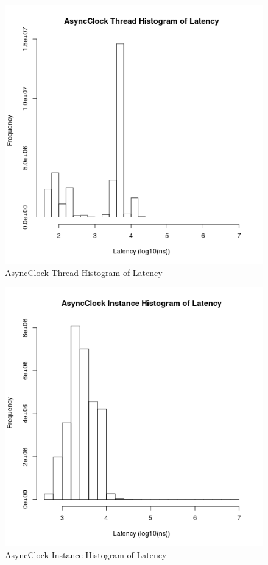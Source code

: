 \begin{figure}
\center
\includegraphics[height=.4\textheight]{async_thread_latency_hist.png}
\caption{AsyncClock Thread Histogram of Latency}
\label{async_thread_latency}
\end{figure}

\begin{figure}
\center
\includegraphics[height=.4\textheight]{async_instance_latency_hist.png}
\caption{AsyncClock Instance Histogram of Latency}
\label{async_instance_latency}
\end{figure}

